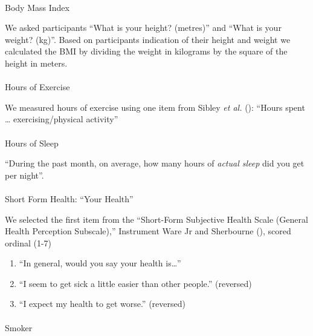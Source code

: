 \documentclass[
  single column]{article}
\makeatletter
\let\oldparagraph\paragraph
\renewcommand{\paragraph}{
    \@ifstar
      \xxxParagraphStar
      \xxxParagraphNoStar
  }
\newcommand{\xxxParagraphStar}[1]{\oldparagraph*{#1}\mbox{}}
\newcommand{\xxxParagraphNoStar}[1]{\oldparagraph{#1}\mbox{}}
\providecommand{\tightlist}{%
  \setlength{\itemsep}{0pt}\setlength{\parskip}{0pt}}\usepackage{longtable,booktabs,array}
\makeatother
\begin{document}
\paragraph{Body Mass Index}\label{body-mass-index}

We asked participants ``What is your height? (metres)'' and ``What is
your weight? (kg)''. Based on participants indication of their height
and weight we calculated the BMI by dividing the weight in kilograms by
the square of the height in meters.

\paragraph{Hours of Exercise}\label{hours-of-exercise}

We measured hours of exercise using one item from Sibley \emph{et al.}
(): ``Hours spent \ldots{}
exercising/physical activity''

\paragraph{Hours of Sleep}\label{hours-of-sleep}

``During the past month, on average, how many hours of \emph{actual
sleep} did you get per night''.

\paragraph{Short Form Health: ``Your
Health''}\label{short-form-health-your-health}

We selected the first item from the ``Short-Form Subjective Health Scale
(General Health Perception Subscale),'' Instrument Ware Jr and
Sherbourne (), scored ordinal
(1-7)

\begin{enumerate}
\def\labelenumi{\arabic{enumi}.}
\tightlist
\item
  ``In general, would you say your health is\ldots{}''
\item
  ``I seem to get sick a little easier than other people.'' (reversed)
\item
  ``I expect my health to get worse.'' (reversed)
\end{enumerate}

\paragraph{Smoker}\label{smoker}
\end{document}
